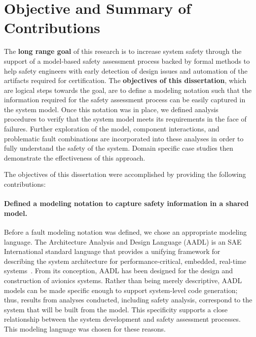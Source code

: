 \section{Objective and Summary of Contributions}
The \textbf{long range goal} of this research is to increase system safety through the support of a model-based safety assessment process backed by formal methods to help safety engineers with early detection of design issues and automation of the artifacts required for certification. The \textbf{objectives of this dissertation}, which are logical steps towards the goal, are to define a modeling notation such that the information required for the safety assessment process can be easily captured in the system model. Once this notation was in place, we defined analysis procedures to verify that the system model meets its requirements in the face of failures. Further exploration of the model, component interactions, and problematic fault combinations are incorporated into these analyses in order to fully understand the safety of the system. Domain specific case studies then demonstrate the effectiveness of this approach.

The objectives of this dissertation were accomplished by providing the following contributions: 

\paragraph{Defined a modeling notation to capture safety information in a shared model.}
Before a fault modeling notation was defined, we chose an appropriate modeling language. The Architecture Analysis and Design Language (AADL) is an SAE International standard language that provides a unifying framework for describing the system architecture for performance-critical, embedded, real-time systems~\cite{AADL_Standard,FeilerModelBasedEngineering2012}. From its conception, AADL has been designed for the design and construction of avionics systems.  Rather than being merely descriptive, AADL models can be made specific enough to support system-level code generation; thus, results from analyses conducted, including safety analysis, correspond to the system that will be built from the model.  This specificity supports a close relationship between the system development and safety assessment processes. This modeling language was chosen for these reasons. 

